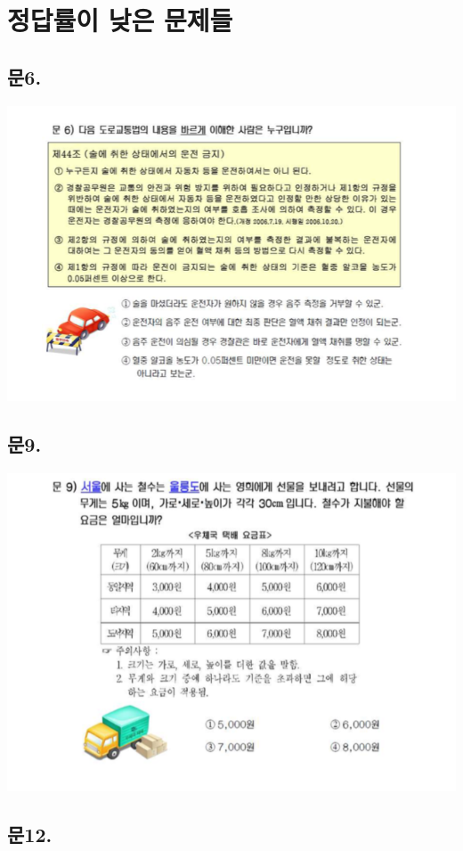 \documentclass[
]{book}
\begin{document}
\section{정답률이 낮은 문제들}\label{uxc815uxb2f5uxb960uxc774-uxb0aeuxc740-uxbb38uxc81cuxb4e4}

\subsection{문6.}\label{uxbb386.}

\begin{flushleft}\includegraphics[width=0.75\linewidth]{./pics/Q06} \end{flushleft}

\subsection{문9.}\label{uxbb389.}

\begin{flushleft}\includegraphics[width=0.75\linewidth]{./pics/Q09} \end{flushleft}

\subsection{문12.}\label{uxbb3812.}
\end{document}
